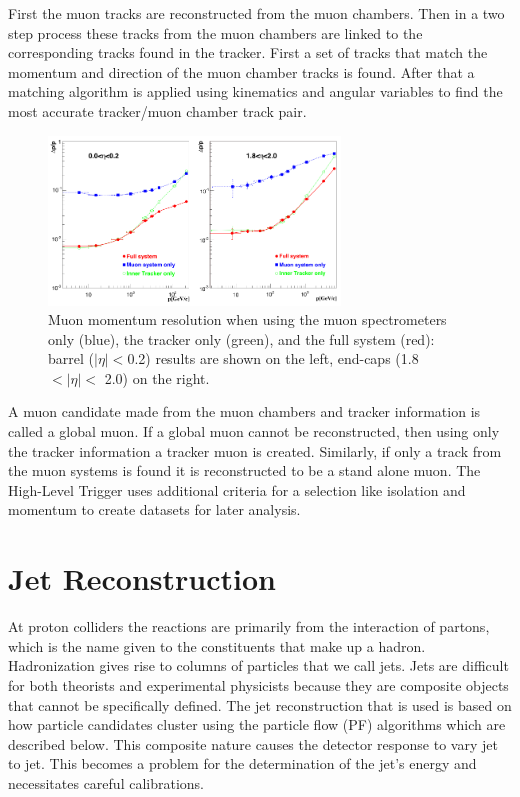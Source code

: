First the muon tracks are reconstructed from the muon chambers. Then in a two step process these tracks from the muon chambers  are linked to the corresponding tracks found in the tracker.  First a set of tracks that match the momentum and direction of the muon chamber tracks is found.  After that a matching algorithm is applied using kinematics and angular variables to find the most accurate tracker/muon chamber track pair.

\begin{figure}[htb]
\centering
\includegraphics[width=0.69\textwidth]{Reconstruction/muon_Pandolfi.pdf}
\caption{Muon momentum resolution when using the muon spectrometers only (blue), the tracker only (green), and the full system (red): barrel ($|\eta| < $0.2) results are shown on the left, end-caps (1.8 $< |\eta| <$ 2.0) on the right.~\cite{Pandolfi_thesis}}
\label{fig:muon_pandolfi}
\end{figure}

A muon candidate made from the muon chambers and tracker information is called a global muon. If a global muon cannot be reconstructed, then using only the tracker information a tracker muon is created.  Similarly, if only a track from the muon systems is found it is reconstructed to be a stand alone muon. The High-Level Trigger uses additional criteria for a selection like isolation and momentum to create datasets for later analysis.

\section{Jet Reconstruction}

At proton colliders the reactions are primarily from the interaction of partons, which is the name given to the constituents that make up a hadron. Hadronization gives rise to columns of particles that we call jets. Jets are difficult for both theorists and experimental physicists because they are composite objects that cannot be specifically defined.  The jet reconstruction that is used is based on how particle candidates cluster using the particle flow (PF) algorithms which are described below.  This composite nature causes the detector response to vary jet to jet. This becomes a problem for the determination of the jet's energy and necessitates careful calibrations.

